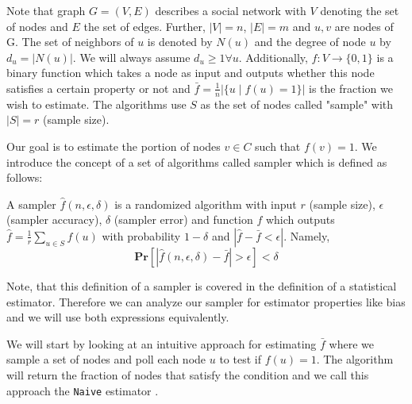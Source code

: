 Note that graph $G = (V,E)$ describes a social network with $V$ denoting the set of nodes and $E$ the set of edges. Further, $|V| = n$, $|E| = m$ and $u,v$ are nodes of G. The set of neighbors of $u$ is denoted by $N(u)$ and the degree of node $u$ by $d_u=|N(u)|$. We will always assume $d_u \geq 1  \forall u$. Additionally, $f : V \rightarrow \{0,1\}$ is a binary function which takes a node as input and outputs whether this node satisfies a certain property or not and $\bar{f} = \frac{1}{n}|\{u\;|\;f(u) = 1\}|$ is the fraction we wish to estimate.
The algorithms use $S$ as the set of nodes called "sample" with $|S| = r$ (sample size).

Our goal is to estimate the portion of nodes $v \in C$ such that $f(v) = 1$.
We introduce the concept of a set of algorithms called sampler which is defined as follows:
\begin{definition}[sampler]
  A sampler $\hat{f}(n,\epsilon,\delta)$ is a randomized algorithm with input $r$ (sample size), $\epsilon$ (sampler accuracy), $\delta$ (sampler error) and function $f$ which outputs $\hat{f}=\frac{1}{r}\sum\nolimits_{u\in S} f(u)$ with probability $1-\delta$ and $|\hat{f}-\bar{f}<\epsilon|$. Namely,
  $$\textbf{Pr}[|\hat{f}(n,\epsilon,\delta)-\bar{f} | > \epsilon] < \delta$$
\end{definition}

Note, that this definition of a sampler is covered in the definition of a statistical estimator.
Therefore we can analyze our sampler for estimator properties like bias and we will use both expressions equivalently.

We will start by looking at an intuitive approach for estimating $\bar{f}$ where we sample a set of nodes and poll each node $u$ to test if $f(u)=1$.
The algorithm will return the fraction of nodes that satisfy the condition and we call this approach the \texttt{Naive} estimator \cite{goldreich1997sample}.

